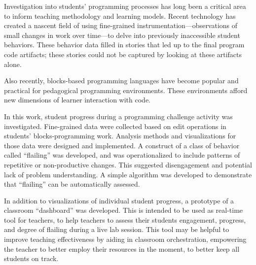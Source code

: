 % 
% 
%


Investigation into students' programming processes has long been a critical area to inform teaching methodology and learning models. Recent technology has created a nascent field of using fine-grained instrumentation---observations of small changes in work over time---to delve into previously inaccessible student behaviors. These behavior data filled in stories that led up to the final program code artifacts; these stories could not be captured by looking at these artifacts alone. 

Also recently, blocks-based programming languages have become popular and practical for pedagogical programming environments. These environments afford new dimensions of learner interaction with code. 

In this work, student progress during a programming challenge activity was investigated. Fine-grained data were collected based on edit operations in students' blocks-programming work. Analysis methods and visualizations for those data were designed and implemented. A construct of a class of behavior called ``flailing'' was developed, and was operationalized to include patterns of repetitive or non-productive changes. This suggested disengagement and potential lack of problem understanding. A simple algorithm was developed to demonstrate that ``flailing'' can be automatically assessed.

In addition to visualizations of individual student progress, a prototype of a classroom ``dashboard'' was developed. This is intended to be used as real-time tool for teachers, to help teachers to assess their students engagement, progress, and degree of flailing during a live lab session. This tool may be helpful to improve teaching effectiveness by aiding in classroom orchestration, empowering the teacher to better employ their resources in the moment, to better keep all students on track.

